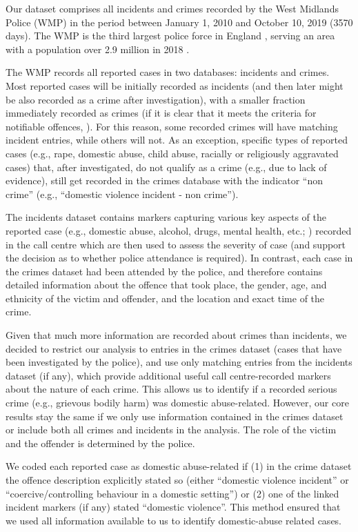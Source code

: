 \documentclass[12pt, a4paper]{article}
\begin{document}
Our dataset comprises all incidents and crimes recorded by the West Midlands Police (WMP) in the period between January 1, 2010 and October 10, 2019 (3570 days). The WMP is the third largest police force in England \cite{Homeoffice}, serving an area with a population over 2.9 million in 2018 \cite{populationfigure}. 

The WMP records all reported cases in two databases: incidents and crimes. Most reported cases will be initially recorded as incidents (and then later might be also recorded as a crime after investigation), with a smaller fraction immediately recorded as crimes (if it is clear that it meets the criteria for notifiable offences, ). For this reason, some recorded crimes will have matching incident entries, while others will not. As an exception, specific types of reported cases (e.g., rape, domestic abuse, child abuse, racially or religiously aggravated cases) that, after investigated, do not qualify as a crime (e.g., due to lack of evidence), still get recorded in the crimes database with the indicator ``non crime'' (e.g., ``domestic violence incident - non crime'').


The incidents dataset contains markers capturing various key aspects of the reported case (e.g., domestic abuse, alcohol, drugs, mental health, etc.; ) recorded in the call centre which are then used to assess the severity of case (and support the decision as to whether police attendance is required). In contrast, each case in the crimes dataset had been attended by the police, and therefore contains detailed information about the offence that took place, the gender, age, and ethnicity of the victim and offender, and the location and exact time of the crime.

Given that much more information are recorded about crimes than incidents, we decided to restrict our analysis to entries in the crimes dataset (cases that have been investigated by the police), and use only matching entries from the incidents dataset (if any), which provide additional useful call centre-recorded markers about the nature of each crime. This allows us to identify if a recorded serious crime (e.g., grievous bodily harm) was domestic abuse-related. However, our core results stay the same if we only use information contained in the crimes dataset or include both all crimes and incidents in the analysis. The role of the victim and the offender is determined by the police.  

We coded each reported case as domestic abuse-related if (1) in the crime dataset the offence description explicitly stated so (either ``domestic violence incident'' or ``coercive/controlling behaviour in a domestic setting'') or (2) one of the linked incident markers (if any) stated ``domestic violence''. This method ensured that we used all information available to us to identify domestic-abuse related cases. 
\end{document}
